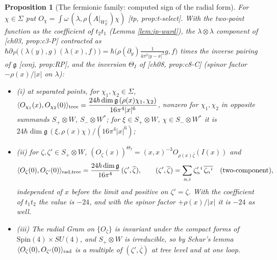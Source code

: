 \documentclass[11pt]{report}
\theoremstyle{plain}
\newtheorem{proposition}[theorem]{Proposition}
\theoremstyle{definition}
\numberwithin{equation}{chapter}
\newcommand{\Wp}{W_{\mathbb R}^\perp}
\newcommand{\rad}{{\rm rad}}
\begin{document}
\begin{proposition}[The fermionic family: computed sign of the radial form]
\label{prop:ip-spin}
For $\chi\in\Sigma$ put $O_\chi=\int\omega\,(\lambda,\rho(A|_{\Wp})\chi)$ [tp, prop:t-select]. With the two-point function as the coefficient of $t_2t_1$ (Lemma \ref{lem:ip-ward}), the $\lambda\otimes\lambda$ component of [ch03, prop:c3-P] contracted as $\hbar\partial_P\big((\lambda(y),g)(\lambda(x),f)\big)=\hbar\big(\rho(\partial_y)\tfrac1{4\pi^2|y-x|^2}g,f\big)$ times the inverse pairing of $\mathfrak g$ [conj, prop:RP], and the inversion $\Theta_I$ of [ch08, prop:c8-C] (spinor factor $-\rho(x)/|x|$ on $\lambda$):
\begin{itemize}
\item (i) at separated points, for $\chi_1,\chi_2\in\Sigma$, $\langle O_{\chi_1}(x),O_{\chi_2}(0)\rangle_{\rm tree}=\dfrac{24\hbar\dim\mathfrak g\,(\rho(x)\chi_1,\chi_2)}{16\pi^4|x|^6}$, nonzero for $\chi_1,\chi_2$ in opposite summands $S_+\otimes W$, $S_-\otimes W^*$; for $\xi\in S_+\otimes W$, $\chi\in S_-\otimes W^*$ it is $24\hbar\dim\mathfrak g\,(\xi,\rho(x)\chi)/(16\pi^4|x|^6)$;
\item (ii) for $\zeta,\zeta'\in S_+\otimes W$, $(O_\zeta(x))^{\Theta_I}=(x,x)^{-3}O_{\rho(x)\overline\zeta}(I(x))$ and
\[
\langle O_\zeta(0),O_{\zeta'}(0)\rangle_{\rad,{\rm tree}}=\frac{24\hbar\dim\mathfrak g}{16\pi^4}\,(\zeta',\overline\zeta),\qquad (\zeta',\overline\zeta)=\sum_{\alpha,i}\zeta'_\alpha{}^i\,\overline{\zeta_\alpha{}^i}\quad\text{(two-component)},
\]
independent of $x$ before the limit and positive on $\zeta'=\zeta$. With the coefficient of $t_1t_2$ the value is $-24$, and with the spinor factor $+\rho(x)/|x|$ it is $-24$ as well.
\item (iii) The radial Gram on $\{O_\zeta\}$ is invariant under the compact forms of $\mathrm{Spin}(4)\times SU(4)$, and $S_+\otimes W$ is irreducible, so by Schur's lemma $\langle O_\zeta(0),O_{\zeta'}(0)\rangle_\rad$ is a multiple of $(\zeta',\overline\zeta)$ at tree level and at one loop.
\end{itemize}
\end{proposition}
\end{document}
